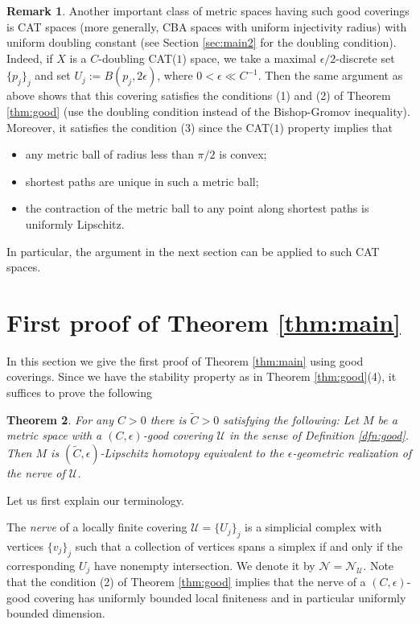 \documentclass[a4paper,12pt]{amsart}
\theoremstyle{plain}
\newtheorem{thm}{Theorem}
\theoremstyle{definition}
\newtheorem{rem}[thm]{Remark}
\numberwithin{thm}{section}
\numberwithin{equation}{section}
\begin{document}
\begin{rem}\label{rem:CAT}
Another important class of metric spaces having such good coverings is CAT spaces (more generally, CBA spaces with uniform injectivity radius) with uniform doubling constant (see Section \ref{sec:main2} for the doubling condition).
Indeed, if $X$ is a $C$-doubling CAT($1$) space, we take a maximal $\epsilon/2$-discrete set $\{p_j\}_j$ and set $U_j:=B(p_j,2\epsilon)$, where $0<\epsilon\ll C^{-1}$.
Then the same argument as above shows that this covering satisfies the conditions (1) and (2) of Theorem \ref{thm:good} (use the doubling condition instead of the Bishop-Gromov inequality).
Moreover, it satisfies the condition (3) since the CAT($1$) property implies that
\begin{itemize}
\item any metric ball of radius less than $\pi/2$ is convex;
\item shortest paths are unique in such a metric ball;
\item the contraction of the metric ball to any point along shortest paths is uniformly Lipschitz.
\end{itemize}
In particular, the argument in the next section can be applied to such CAT spaces.
\end{rem}

\section{First proof of Theorem \ref{thm:main}}\label{sec:main1}

In this section we give the first proof of Theorem \ref{thm:main} using good coverings.
Since we have the stability property as in Theorem \ref{thm:good}(4), it suffices to prove the following

\begin{thm}\label{thm:nerve}
For any $C>0$ there is $\tilde C>0$ satisfying the following:
Let $M$ be a metric space with a $(C,\epsilon)$-good covering $\mathcal U$ in the sense of Definition \ref{dfn:good}.
Then $M$ is $(\tilde C,\epsilon)$-Lipschitz homotopy equivalent to the $\epsilon$-geometric realization of the nerve of $\mathcal U$.
\end{thm}

Let us first explain our terminology.

The \textit{nerve} of a locally finite covering $\mathcal U=\{U_j\}_j$ is a simplicial complex with vertices $\{v_j\}_j$ such that a collection of vertices spans a simplex if and only if the corresponding $U_j$ have nonempty intersection.
We denote it by $\mathcal N=\mathcal N_\mathcal U$.
Note that the condition (2) of Theorem \ref{thm:good} implies that the nerve of a $(C,\epsilon)$-good covering has uniformly bounded local finiteness and in particular uniformly bounded dimension.
\end{document}

